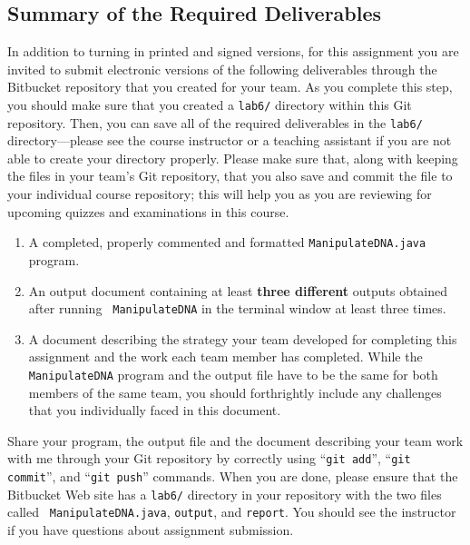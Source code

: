 \vspace{-0.25in}
\subsection*{Summary of the Required Deliverables}
\vspace{-0.05in}

In addition to turning in printed and signed versions, for this assignment you are invited to submit electronic versions
of the following deliverables through the Bitbucket repository that you created for your team. As you complete this
step, you should make sure that you created a {\tt lab6/} directory within this Git repository.  Then, you can save all
of the required deliverables in the {\tt lab6/} directory---please see the course instructor or a teaching assistant if
you are not able to create your directory properly. Please make sure that, along with keeping the files in your team's
Git repository, that you also save and commit the file to your individual course repository; this will help you as you
are reviewing for upcoming quizzes and examinations in this course.

\vspace*{-.1in}
\begin{enumerate}

  \itemsep0in

  \item A completed, properly commented and formatted {\tt ManipulateDNA.java} program.

  \item An output document containing at least \textbf{three different} outputs obtained after running {\tt
    ManipulateDNA} in the terminal window at least three times.

  \item A document describing the strategy your team developed for completing this assignment and the work each team
    member has completed. While the {\tt ManipulateDNA} program and the output file have to be the same for both members
    of the same team, you should forthrightly include any challenges that you individually faced in this document.

\end{enumerate}
\vspace{-0.1in}

Share your program, the output file and the document describing your team work with me through your Git repository by
correctly using ``{\tt git add}'', ``{\tt git commit}'', and ``{\tt git push}'' commands. When you are done, please
ensure that the Bitbucket Web site has a {\tt lab6/} directory in your repository with the two files called {\tt
ManipulateDNA.java}, {\tt output}, and {\tt report}. You should see the instructor if you have questions about
assignment submission.

